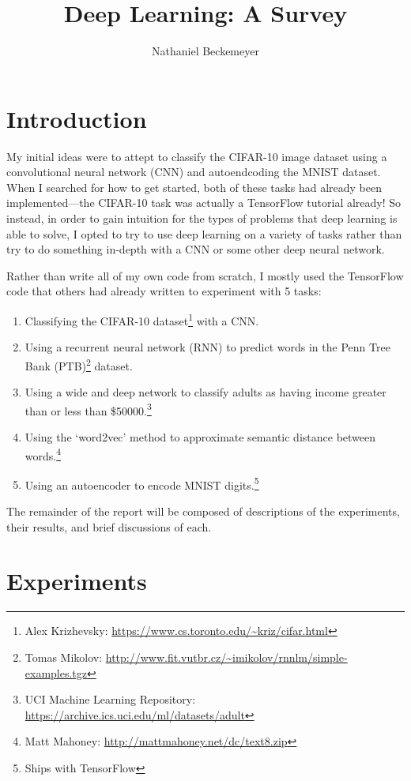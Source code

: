 \documentclass{journal}
\title{Deep Learning: A Survey}
\author{Nathaniel Beckemeyer}
\begin{document}
\maketitle{}

\section{Introduction}
My initial ideas were to attept to classify the CIFAR-10 image
dataset using a convolutional neural network (CNN) and autoendcoding
the MNIST dataset. When I searched for how to get started, both of these tasks
had already been implemented---the CIFAR-10 task was actually a TensorFlow
tutorial already! So instead, in order to gain intuition for the types of
problems that deep learning is able to solve, I opted to try to use deep
learning on a variety of
tasks rather than try to do something in-depth with a
CNN or some other deep neural network.

Rather than write all of my
own code from scratch, I mostly used the TensorFlow code that others had already
written to experiment with 5 tasks:
\begin{enumerate}
    \item{Classifying the CIFAR-10 dataset\footnote{Alex Krizhevsky:
          \url{https://www.cs.toronto.edu/~kriz/cifar.html}} with a CNN.}
    \item{Using a recurrent neural network (RNN) to predict words in the
          Penn Tree Bank (PTB)\footnote{Tomas Mikolov:
          \url{http://www.fit.vutbr.cz/~imikolov/rnnlm/simple-examples.tgz}}
          dataset.}
    \item{Using a wide and deep network to classify adults as having income
          greater than or less than \$50000.\footnote{UCI
          Machine Learning Repository:
          \url{https://archive.ics.uci.edu/ml/datasets/adult}}}
    \item{Using the `word2vec' method to approximate semantic distance
          between words.\footnote{Matt Mahoney:
          \url{http://mattmahoney.net/dc/text8.zip}}}
    \item{Using an autoencoder to encode MNIST digits.\footnote{Ships with
          TensorFlow}}
\end{enumerate}

The remainder of the report will be composed of descriptions of the experiments,
their results, and brief discussions of each.


\section{Experiments}
\end{document}
